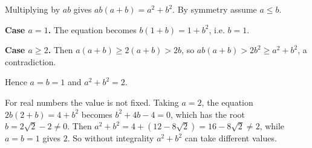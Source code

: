 Multiplying by $ab$ gives $ab(a+b)=a^2+b^2$. By symmetry assume $a\le b$.

\textbf{Case $a=1$.} The equation becomes $b(1+b)=1+b^2$, i.e. $b=1$.

\textbf{Case $a\ge2$.} Then $a(a+b)\ge 2(a+b)>2b$, so $ab(a+b)>2b^2\ge a^2+b^2$, a contradiction.

Hence $a=b=1$ and $a^2+b^2=\boxed{2}$.

For real numbers the value is not fixed. Taking $a=2$, the equation $2b(2+b)=4+b^2$ becomes $b^2+4b-4=0$, which has the root $b=2\sqrt2-2\ne0$. Then $a^2+b^2=4+(12-8\sqrt2)=16-8\sqrt2\ne2$, while $a=b=1$ gives $2$. So without integrality $a^2+b^2$ can take different values.
